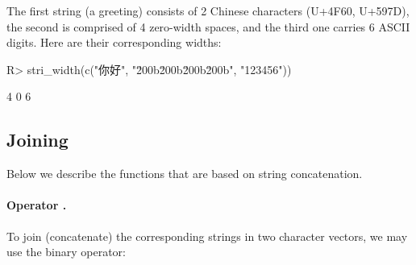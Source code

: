\documentclass[nojss]{jss}
\begin{document}
\noindent
The first string (a greeting) consists of 2 Chinese characters
(U+4F60, U+597D),
the second is comprised of 4 zero-width spaces, and the third one
carries 6 ASCII digits. Here are their corresponding widths:

\begin{Schunk}
\begin{Sinput}
R> stri_width(c("你好", "\u200b\u200b\u200b\u200b", "123456"))
\end{Sinput}
\begin{Soutput}
[1] 4 0 6
\end{Soutput}
\end{Schunk}












\subsection{Joining}

Below we describe the functions that are based on string concatenation.


\paragraph{Operator .}
To join (concatenate) the corresponding strings in two character vectors,
we may use the binary  operator:
\end{document}
